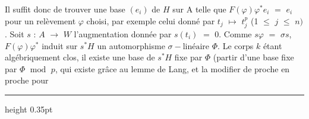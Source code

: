 \documentclass[9pt]{article}
\newcommand{\CanonText}[1]{\par{\fontsize{8.0}{9.35}\selectfont\RaggedRight #1\par}\vspace{2.2pt}}
\begin{document}
\begin{minipage}[t][\dimexpr\textheight-5pt\relax][t]{\textwidth}
\CanonText{Il suffit donc de trouver une base \((e_{i})\) de \(H\) sur A telle que \(F(\varphi{})\varphi{}^{*}e_{i}\) \(=\) \(e_{i}\) pour un relèvement \(\varphi{}\) choisi, par exemple celui donné par \(t_{j}\) \(\mapsto{}\) \(t_{j}^{p}\) (1 \(\leq{}\) \(j\) \(\leq{}\) \(n)\). Soit \(s\) : \(A\) \(\to{}\) \(W\) l'augmentation donnée par \(s(t_{i})\) \(=\) 0. Comme \(s\varphi{}\) \(=\) \(\sigma{}s\), \(F(\varphi{})\varphi{}^{*}\) induit sur \(s^{*}H\) un automorphisme \(\sigma{}-\text{linéaire}\) \(\Phi{}\). Le corps \(k\) étant algébriquement clos, il existe une base de \(s^{*}H\) fixe par \(\Phi{}\) (partir d'une base fixe par \(\Phi{}\) \(\operatorname{mod}\) \(p\), qui existe grâce au lemme de Lang, et la modifier de proche en proche pour}
\vfill
{\color{Accent}\hrule height 0.35pt}\vspace{3pt}
\end{minipage}
\newpage
\end{document}

